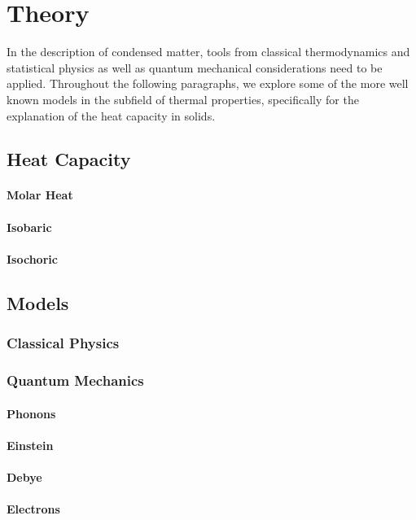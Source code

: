 \section[Theory]{Theory \textnormal{\cite{GrossMarx+2022}}}
\label{sec:theory}

In the description of condensed matter, tools from classical thermodynamics and statistical physics as well
as quantum mechanical considerations need to be applied. Throughout the following paragraphs, we explore some
of the more well known models in the subfield of thermal properties, specifically for the explanation of the
heat capacity in solids.

\subsection{Heat Capacity}



\paragraph{Molar Heat}

\paragraph{Isobaric}

\paragraph{Isochoric}

\subsection{Models}

\subsubsection{Classical Physics}

\subsubsection{Quantum Mechanics}

\paragraph{Phonons}

\paragraph{Einstein}

\paragraph{Debye}

\paragraph{Electrons}
